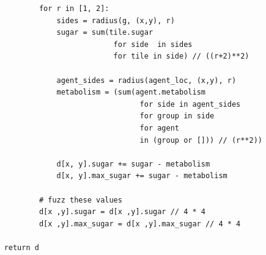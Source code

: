 \begin{verbatim}
            for r in [1, 2]:
                sides = radius(g, (x,y), r)
                sugar = sum(tile.sugar 
                             for side  in sides
                             for tile in side) // ((r+2)**2)
                
                agent_sides = radius(agent_loc, (x,y), r)
                metabolism = (sum(agent.metabolism 
                                   for side in agent_sides
                                   for group in side 
                                   for agent 
                                   in (group or [])) // (r**2))
                
                d[x, y].sugar += sugar - metabolism
                d[x, y].max_sugar += sugar - metabolism
            
            # fuzz these values
            d[x ,y].sugar = d[x ,y].sugar // 4 * 4
            d[x ,y].max_sugar = d[x ,y].max_sugar // 4 * 4

    return d
\end{verbatim}


